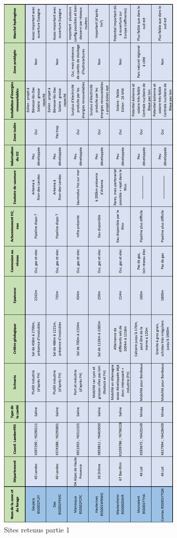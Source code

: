 \documentclass[11pt,french,a4paper]{article}
\begin{document}
\begin{figure}[h]
\centering
\includegraphics[width=\textwidth,height=\textheight,keepaspectratio]{image/annexe/chap4/sites_1.png}
\caption{Sites retenus partie 1}
\end{figure}
\end{document}
